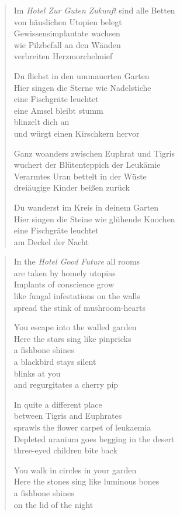 
\cleartoverso


\begin{verse}
Im \emph{Hotel Zur Guten Zukunft} sind alle Betten\\
von häuslichen Utopien belegt\\
Gewissensimplantate wachsen\\
wie Pilzbefall an den Wänden\\
verbreiten Herzmorchelmief

Du fliehst in den ummauerten Garten\\
Hier singen die Sterne wie Nadelstiche\\
eine Fischgräte leuchtet\\
eine Amsel bleibt stumm\\
blinzelt dich an\\
und würgt einen Kirschkern hervor

Ganz woanders zwischen Euphrat und Tigris\\
wuchert der Blütenteppich der Leukämie\\
Verarmtes Uran bettelt in der Wüste\\
dreiäugige Kinder beißen zurück

Du wanderst im Kreis in deinem Garten\\
Hier singen die Steine wie glühende Knochen\\
eine Fischgräte leuchtet\\
am Deckel der Nacht
\end{verse}

\cleartorecto


\begin{verse}
In the \emph{Hotel Good Future} all rooms\\
are taken by homely utopias\\
Implants of conscience grow\\
like fungal infestations on the walls\\
spread the stink of mushroom-hearts

You escape into the walled garden\\
Here the stars sing like pinpricks\\
a fishbone shines\\
a blackbird stays silent\\
blinks at you\\
and regurgitates a cherry pip

In quite a different place\\
between Tigris and Euphrates\\
sprawls the flower carpet of leukaemia\\
Depleted uranium goes begging in the desert\\
three-eyed children bite back

You walk in circles in your garden\\
Here the stones sing like luminous bones\\
a fishbone shines\\
on the lid of the night
\end{verse}

